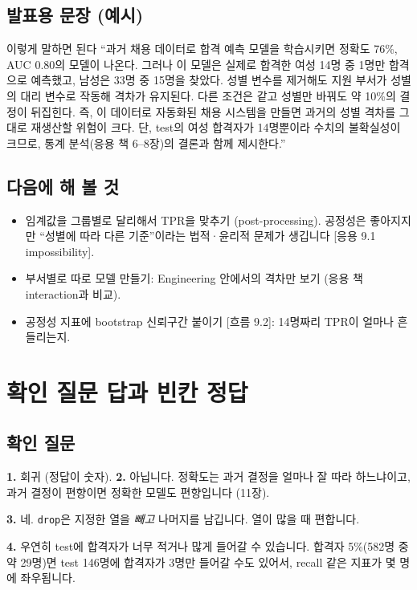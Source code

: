 \documentclass[11pt,a4paper]{article}
\newcommand{\code}[1]{\texttt{#1}}
\begin{document}
\subsection{발표용 문장 (예시)}
\begin{goalbox}{이렇게 말하면 된다}
``과거 채용 데이터로 합격 예측 모델을 학습시키면 정확도 76\%, AUC 0.80의 모델이 나온다. 그러나 이 모델은 실제로 합격한 여성 14명 중 1명만 합격으로 예측했고, 남성은 33명 중 15명을 찾았다. 성별 변수를 제거해도 지원 부서가 성별의 대리 변수로 작동해 격차가 유지된다. 다른 조건은 같고 성별만 바꿔도 약 10\%의 결정이 뒤집힌다. 즉, 이 데이터로 자동화된 채용 시스템을 만들면 과거의 성별 격차를 그대로 재생산할 위험이 크다. 단, test의 여성 합격자가 14명뿐이라 수치의 불확실성이 크므로, 통계 분석(응용 책 6–8장)의 결론과 함께 제시한다.''
\end{goalbox}

\subsection{다음에 해 볼 것}
\begin{itemize}
\item 임계값을 그룹별로 달리해서 TPR을 맞추기 (post-processing). 공정성은 좋아지지만 ``성별에 따라 다른 기준''이라는 법적·윤리적 문제가 생깁니다 [응용 9.1 impossibility].
\item 부서별로 따로 모델 만들기: Engineering 안에서의 격차만 보기 (응용 책 interaction과 비교).
\item 공정성 지표에 bootstrap 신뢰구간 붙이기 [흐름 9.2]: 14명짜리 TPR이 얼마나 흔들리는지.
\end{itemize}

\section{확인 질문 답과 빈칸 정답}
\subsection{확인 질문}
\textbf{1.} 회귀 (정답이 숫자). \quad \textbf{2.} 아닙니다. 정확도는 과거 결정을 얼마나 잘 따라 하느냐이고, 과거 결정이 편향이면 정확한 모델도 편향입니다 (11장).

\textbf{3.} 네. \code{drop}은 지정한 열을 \emph{빼고} 나머지를 남깁니다. 열이 많을 때 편합니다.

\textbf{4.} 우연히 test에 합격자가 너무 적거나 많게 들어갈 수 있습니다. 합격자 5\%(582명 중 약 29명)면 test 146명에 합격자가 3명만 들어갈 수도 있어서, recall 같은 지표가 몇 명에 좌우됩니다.
\end{document}
